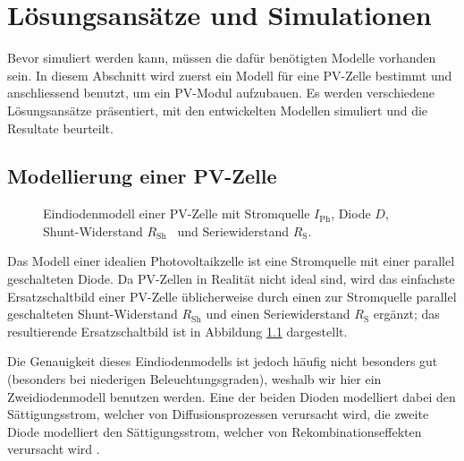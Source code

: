\chapter{L\"osungsans\"atze und Simulationen}
\label{chap:simu}

Bevor  simuliert  werden  kann,  m\"ussen  die  daf\"ur  ben\"otigten  Modelle
vorhanden sein. In diesem Abschnitt wird zuerst ein Modell f\"ur eine PV-Zelle
bestimmt und  anschliessend benutzt,  um ein  PV-Modul aufzubauen.   Es werden
verschiedene L\"osungsans\"atze  pr\"asentiert, mit den  entwickelten Modellen
simuliert und die Resultate beurteilt.


\section{Modellierung einer PV-Zelle}
\label{sec:simu:model:cell}

\begin{figure}
    \centering
    
    \caption{%
        Eindiodenmodell  einer  PV-Zelle  mit  Stromquelle  $I_{\mathrm{Ph}}$,
        Diode  $D$,  Shunt-Widerstand $R_{\mathrm{Sh}}$~  und  Seriewiderstand
        $R_{\mathrm{S}}$.%
    }
    \label{fig:pvcell:1diode}
\end{figure}

Das Modell  einer idealien  Photovoltaikzelle ist  eine Stromquelle  mit einer
parallel geschalteten Diode. Da PV-Zellen in Realit\"at nicht ideal sind, wird
das einfachste Ersatzschaltbild einer PV-Zelle \"ublicherweise durch einen zur
Stromquelle parallel geschalteten Shunt-Widerstand $R_{\mathrm{Sh}}$ und einen
Seriewiderstand $R_{\mathrm{S}}$ erg\"anzt; das resultierende Ersatzschaltbild
ist in Abbildung \ref{fig:pvcell:1diode} dargestellt.

Die Genauigkeit  dieses Eindiodenmodells  ist jedoch h\"aufig  nicht besonders
gut  \cite{pvcell:phang}  \cite{pvcell:masmoudi}   (besonders  bei  niederigen
Beleuchtungsgraden),   weshalb   wir   hier  ein   Zweidiodenmodell   benutzen
werden. Eine  der  beiden  Dioden   modelliert  dabei  den  S\"attigungsstrom,
welcher von  Diffusionsprozessen verursacht wird, die  zweite Diode modelliert
den  S\"attigungsstrom,  welcher  von Rekombinationseffekten  verursacht  wird
\cite{pvcell:masmoudi}.

